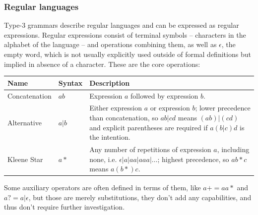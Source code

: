 			\subsubsection{Regular languages}
			
			Type-3 grammars describe regular languages and can be expressed as regular expressions. Regular expressions consist of terminal symbols -- characters in the alphabet of the language -- and operations combining them, as well as $\epsilon$, the empty word, which is not usually explicitly used outside of formal definitions but implied in absence of a character. These are the core operations:
			
			
			\begin{center}
			\begin{tabular}{ l l p{10cm} }
			\toprule
			Name         & Syntax & Description \\
			\midrule
			Concatenation & $ab$  & Expression $a$ followed by expression $b$. \\
			Alternative   & $a|b$ & Either expression $a$ or expression $b$; lower precedence than concatenation, so $ab|cd$ means $(ab)|(cd)$ and explicit parentheses are required if $a(b|c)d$ is the intention. \\
			Kleene Star   & $a*$  & Any number of repetitions of expression $a$, including none, i.e. $\epsilon|a|aa|aaa|\ldots$; highest precedence, so $ab*c$ means $a(b*)c$. \\
			\bottomrule
			\end{tabular}
			\end{center}
			
			Some auxiliary operators are often defined in terms of them, like $a+ = aa*$ and $a? = a|\epsilon$, but those are merely substitutions, they don't add any capabilities, and thus don't require further investigation.
			
			
